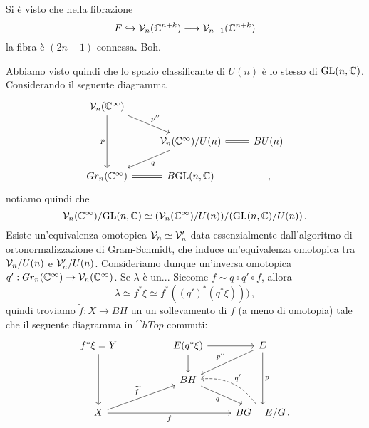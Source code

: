 Si è visto che nella fibrazione 
\begin{equation*}
	F \hookrightarrow \mathcal{V}_{n}(\mathbb{C}^{n+k}) \longrightarrow \mathcal{V}_{n-1}(\mathbb{C}^{n+k})
\end{equation*}
la fibra è $(2n-1)$-connessa. Boh.

Abbiamo visto quindi che lo spazio classificante di $U(n)$
è lo stesso di $\mathrm{GL}(n,\mathbb{C})$. Considerando il seguente diagramma
\begin{equation*}
\begin{tikzcd}
\Vv_{n}(\C^{\infty}) \arrow[rd, "p''"] \arrow[dd, "p"'] &                                                                      &       \\
                                                    & \Vv_{n}(\C^{\infty})/U(n) \arrow[ld, "q"] \arrow[r,equals] & BU(n) \\
Gr_{n}(\C^{\infty}) \arrow[r,equals]  & {B\mathrm{GL}(n,\C)}                                                 &      \,,
\end{tikzcd}
\end{equation*}
notiamo quindi che 
\begin{equation*}
	\mathcal{V}_{n}(\mathbb{C}^{\infty})/ \mathrm{GL}(n,\mathbb{C}) \simeq (\mathcal{V}_{n}(\mathbb{C}^{\infty})/U(n))/(\mathrm{GL}(n,\mathbb{C})/U(n))\,.
\end{equation*}
Esiste un'equivalenza omotopica $\mathcal{V}_{n} \simeq \mathcal{V}'_{n}$ data essenzialmente
dall'algoritmo di ortonormalizzazione di Gram-Schmidt, che induce un'equivalenza omotopica
tra $\mathcal{V}_{n}/U(n)$ e $\mathcal{V}'_{n}/U(n)$.
Consideriamo dunque un'inversa omotopica $q':Gr_{n}(\mathbb{C}^{\infty}) \to \mathcal{V}_{n}(\mathbb{C}^{\infty})$.
Se $\lambda$ è un...
Siccome $f \sim q \circ q' \circ f$, allora
\begin{equation*}
	\lambda \simeq f^{*}\xi \simeq f^{*}((q')^{*}(q^{*}\xi)))\,,
\end{equation*}
quindi troviamo  $\widetilde{f}:X \to BH$ un un sollevamento di $f$ (a meno di omotopia)
tale che il seguente diagramma in $\cat{hTop}$ commuti:
\begin{equation*}
	\begin{tikzcd}
		f^{*}\xi = Y \ar[dd] & & E(q^{*}\xi) \ar[r] \ar[d]
		& E \ar[dd, "p"] \ar[dl,"p''"'] \\
		& & BH \ar[dr, "q"'] & \\
		X \ar[rrr, "f"'] \ar[rru, "\widetilde{f}"] 
		& & & BG = E/G \ar[ul, "q'"', bend right, dashed]\,.
	\end{tikzcd}
\end{equation*}

